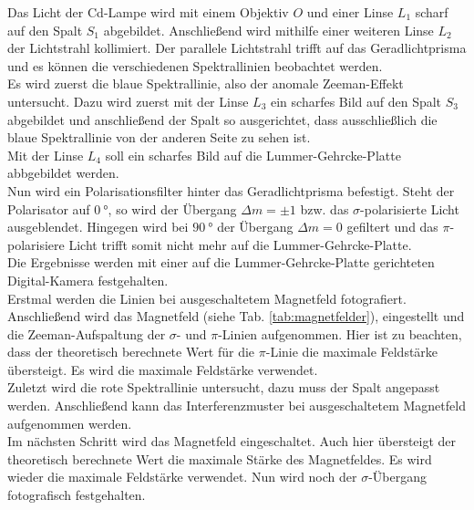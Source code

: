 Das Licht der Cd-Lampe wird mit einem Objektiv $O$ und einer Linse $L_1$ scharf auf den Spalt $S_1$ abgebildet.
Anschließend wird mithilfe einer weiteren Linse $L_2$ der Lichtstrahl kollimiert.
Der parallele Lichtstrahl trifft auf das Geradlichtprisma und es können die verschiedenen Spektrallinien beobachtet werden.
\\
Es wird zuerst die blaue Spektrallinie, also der anomale Zeeman-Effekt untersucht.
Dazu wird zuerst mit der Linse $L_3$ ein scharfes Bild auf den Spalt $S_3$ abgebildet und anschließend der Spalt so ausgerichtet, dass ausschließlich die blaue Spektrallinie von der anderen Seite zu sehen ist.
\\
Mit der Linse $L_4$ soll ein scharfes Bild auf die Lummer-Gehrcke-Platte abbgebildet werden.
\\
Nun wird ein Polarisationsfilter hinter das Geradlichtprisma befestigt.
Steht der Polarisator auf $\SI{0}{\degree}$, so wird der Übergang $\Delta m = \pm 1$ bzw. das $\sigma$-polarisierte Licht ausgeblendet.
Hingegen wird bei $\SI{90}{\degree}$ der Übergang $\Delta m = 0$ gefiltert und das $\pi$-polarisiere Licht trifft somit nicht mehr auf die Lummer-Gehrcke-Platte.
\\
Die Ergebnisse werden mit einer auf die Lummer-Gehrcke-Platte gerichteten Digital-Kamera festgehalten.
\\
Erstmal werden die Linien bei ausgeschaltetem Magnetfeld fotografiert.
Anschließend wird das Magnetfeld (siehe Tab. \ref{tab:magnetfelder}), eingestellt und die Zeeman-Aufspaltung der $\sigma$- und $\pi$-Linien aufgenommen.
Hier ist zu beachten, dass der theoretisch berechnete Wert für die $\pi$-Linie die maximale Feldstärke übersteigt.
Es wird die maximale Feldstärke verwendet.
\\
Zuletzt wird die rote Spektrallinie untersucht, dazu muss der Spalt angepasst werden.
Anschließend kann das Interferenzmuster bei ausgeschaltetem Magnetfeld aufgenommen werden.
\\
Im nächsten Schritt wird das Magnetfeld eingeschaltet.
Auch hier übersteigt der theoretisch berechnete Wert die maximale Stärke des Magnetfeldes.
Es wird wieder die maximale Feldstärke verwendet.
Nun wird noch der $\sigma$-Übergang fotografisch festgehalten.